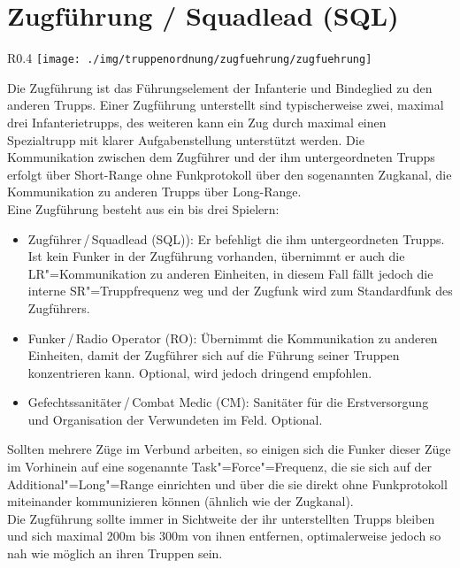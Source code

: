 \section{Zugführung / Squadlead (SQL)}
\begin{wrapfigure}{R}{0.4\textwidth}
	\centering 
	\texttt{[image: ./img/truppenordnung/zugfuehrung/zugfuehrung]}
\end{wrapfigure}	

Die Zugführung ist das Führungselement der Infanterie und Bindeglied zu den anderen Trupps. Einer Zugführung unterstellt sind typischerweise zwei, maximal drei Infanterietrupps, des weiteren kann ein Zug durch maximal einen Spezialtrupp mit klarer Aufgabenstellung unterstützt werden. Die Kommunikation zwischen dem Zugführer und der ihm untergeordneten Trupps erfolgt über Short-Range ohne Funkprotokoll über den sogenannten Zugkanal, die Kommunikation zu anderen Trupps über Long-Range.\\
Eine Zugführung besteht aus ein bis drei Spielern:
\begin{itemize}
	\item Zugführer\,/\,Squadlead (SQL)): Er befehligt die ihm untergeordneten Trupps. Ist kein Funker in der Zugführung vorhanden, übernimmt er auch die LR"=Kommunikation zu anderen Einheiten, in diesem Fall fällt jedoch die interne SR"=Truppfrequenz weg und der Zugfunk wird zum Standardfunk des Zugführers.
	\item Funker\,/\,Radio Operator (RO): Übernimmt die Kommunikation zu anderen Einheiten, damit der Zugführer sich auf die Führung seiner Truppen konzentrieren kann. Optional, wird jedoch dringend empfohlen.
	\item Gefechtssanitäter\,/\,Combat Medic (CM): Sanitäter für die Erstversorgung und Organisation der Verwundeten im Feld. Optional.
\end{itemize}
Sollten mehrere Züge im Verbund arbeiten, so einigen sich die Funker dieser Züge im Vorhinein auf eine sogenannte Task"=Force"=Frequenz, die sie sich auf der Additional"=Long"=Range einrichten und über die sie direkt ohne Funkprotokoll miteinander kommunizieren können (ähnlich wie der Zugkanal).\\
Die Zugführung sollte immer in Sichtweite der ihr unterstellten Trupps bleiben und sich maximal 200m bis 300m von ihnen entfernen, optimalerweise jedoch so nah wie möglich an ihren Truppen sein.